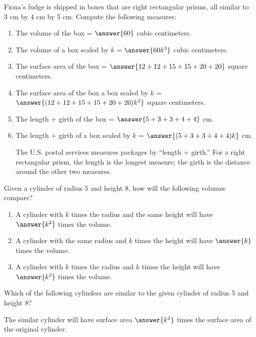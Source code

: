 \documentclass[nooutcomes]{ximera}
\begin{document}
\begin{question}
Fiona's fudge is shipped in boxes that are right rectangular prisms, all similar to 3 cm by 4 cm by 5 cm.  Compute the following measures: 
\begin{enumerate}
\item The volume of the box = $\answer{60}$ cubic centimeters.
\item The volume of a box scaled by $k$ = $\answer{60k^3}$ cubic centimeters.
\item The surface area of the box = $\answer{12+12+15+15+20+20}$ square centimeters. 
\item The surface area of the box a box scaled by $k$ = $\answer{(12+12+15+15+20+20)k^2}$ square centimeters. 
\item The length + girth of the box = $\answer{5 + 3 + 3 + 4 + 4}$ cm.
\item The length + girth of a box scaled by $k$ = $\answer{(5 + 3 + 3 + 4 + 4)k}$ cm. 
\begin{hint}The U.S. postal services measures packages by ``length + girth.''  For a right rectangular prism, the length is the longest measure; the girth is the distance around the other two measures.  \end{hint}
\end{enumerate}
\end{question}

\begin{question}
Given a cylinder of radius $5$ and height $8$, how will the following volumes compare?  
\begin{enumerate}
\item A cylinder with $k$ times the radius and the same height will have  $\answer{k^2}$ times the volume.  
\item A cylinder with the same radius and $k$ times the height will have  $\answer{k}$ times the volume. 
\item A cylinder with $k$ times the radius and $k$ times the height will have  $\answer{k^3}$ times the volume. 
\end{enumerate}
\end{question}

\begin{question}
Which of the following cylinders are similar to the given cylinder of radius 5 and height 8?  
\begin{selectAll}
\end{selectAll}

The similar cylinder will have surface area $\answer{k^2}$ times the surface area of the original cylinder.  
\end{question}
\end{document}

